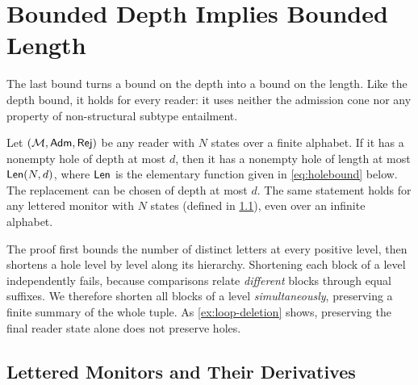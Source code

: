 \section{Bounded Depth Implies Bounded Length}
\label{sec:search}

The last bound turns a bound on the depth into a bound on the length. Like the depth bound,
it holds for every reader: it uses neither the admission cone nor any property of
non-structural subtype entailment.

\begin{theorem}\label{thm:search}
Let $(\mathcal{M},\mathsf{Adm},\mathsf{Rej})$ be any reader with $N$ states over a finite alphabet. If it has a
nonempty hole of depth at most $d$, then it has a nonempty hole of length at most
$\mathsf{Len}(N,d)$, where $\mathsf{Len}$ is the elementary function given in
\eqref{eq:holebound} below. The replacement can be chosen of depth at most $d$.
The same statement holds for any lettered monitor with $N$ states
(defined in \cref{sec:lettered}), even over an infinite alphabet.
\end{theorem}

The proof first bounds the number of distinct letters at every positive
level, then shortens a hole level by level along its hierarchy. Shortening each block of a
level independently fails, because comparisons relate \emph{different} blocks through equal
suffixes. We therefore shorten all blocks of a level \emph{simultaneously}, preserving a
finite summary of the whole tuple. As \cref{ex:loop-deletion} shows,
preserving the final reader state alone does not preserve holes.

\subsection{Lettered Monitors and Their Derivatives}\label{sec:lettered}

